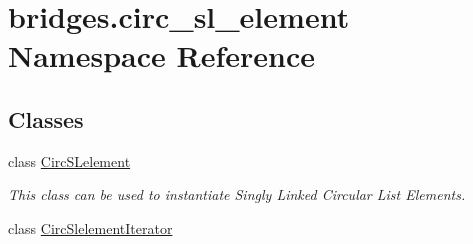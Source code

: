 \hypertarget{namespacebridges_1_1circ__sl__element}{}\section{bridges.\+circ\+\_\+sl\+\_\+element Namespace Reference}
\label{namespacebridges_1_1circ__sl__element}
\subsection*{Classes}
\begin{DoxyCompactItemize}
\item 
class \hyperlink{classbridges_1_1circ__sl__element_1_1_circ_s_lelement}{Circ\+S\+Lelement}
\begin{DoxyCompactList}\small\item\em This class can be used to instantiate Singly Linked Circular List Elements. \end{DoxyCompactList}\item 
class \hyperlink{classbridges_1_1circ__sl__element_1_1_circ_slelement_iterator}{Circ\+Slelement\+Iterator}
\end{DoxyCompactItemize}
